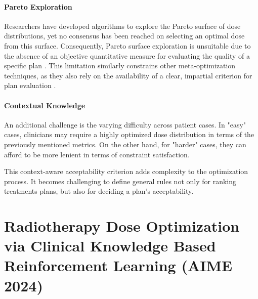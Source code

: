 \paragraph{Pareto Exploration}
Researchers have developed algorithms to explore the Pareto surface of dose distributions, yet no consensus has been reached on selecting an optimal dose from this surface.
Consequently, Pareto surface exploration is unsuitable due to the absence of an objective quantitative measure for evaluating the quality of a specific plan \cite{huang_pareto_2021}.
This limitation similarly constrains other meta-optimization techniques, as they also rely on the availability of a clear, impartial criterion for plan evaluation \cite{wu_optimization_2001, xing_optimization_1999}.

\paragraph{Contextual Knowledge}
An additional challenge is the varying difficulty across patient cases.
In "easy" cases, clinicians may require a highly optimized dose distribution in terms of the previously mentioned metrics.
On the other hand, for "harder" cases, they can afford to be more lenient in terms of constraint satisfaction.

This context-aware acceptability criterion adds complexity to the optimization process.
It becomes challenging to define general rules not only for ranking treatments plans, but also for deciding a plan's acceptability.


\section{Radiotherapy Dose Optimization via Clinical Knowledge Based Reinforcement Learning (AIME 2024)}


